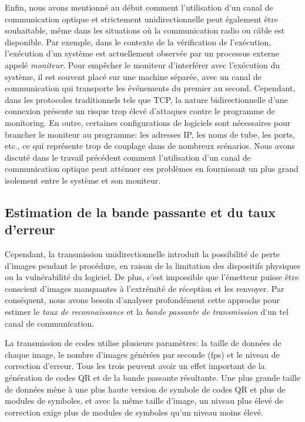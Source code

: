 Enfin, nous avons mentionné au début comment l'utilisation d'un canal de communication optique et strictement unidirectionnelle peut également être souhaitable, même dans les situations où la communication radio ou câble est disponible. Par exemple, dans le contexte de la vérification de l'exécution, l'exécution d'un système est actuellement observée par un processus externe appelé \emph{moniteur}. Pour empêcher le moniteur d'interférer avec l'exécution du système, il est souvent placé sur une machine séparée, avec un canal de communication qui transporte les événements du premier au second. Cependant, dans les protocoles traditionnels tels que TCP, la nature bidirectionnelle d'une connexion présente un risque trop élevé d'attaques contre le programme de monitoring. En outre, certaines configurations de logiciels sont nécessaires pour brancher le moniteur au programme: les adresses IP, les noms de tube, les ports, etc., ce qui représente trop de couplage dans de nombreux scénarios. Nous avons discuté dans le travail précédent \citep{DBLP_conf/rv/LavoieLVGH14} comment l'utilisation d'un canal de communication optique peut atténuer ces problèmes en fournissant un plus grand isolement entre le système et son moniteur.

\subsection{Estimation de la bande passante et du taux d'erreur}

Cependant, la transmission unidirectionnelle introduit la possibilité de perte d'images pendant le procédure, en raison de la limitation des dispositifs physiques ou la vulnérabilité du logiciel. De plus, c'est impossible que l'émetteur puisse être conscient d'images manquantes à l'extrémité de réception et les renvoyer. Par conséquent, nous avons besoin d'analyser profondément cette approche pour estimer le \emph{taux de reconnaissance} et la \emph{bande passante de transmission} d'un tel canal de communication.

La transmission de codes utilise plusieurs paramètres: la taille de données de chaque image, le nombre d'images générées par seconde (fps) et le niveau de correction d'erreur. Tous les trois peuvent avoir un effet important de la génération de codes QR et de la bande passante résultante. Une plus grande taille de données mène à une plus haute version de symbole de codes QR et plus de modules de symboles, et avec la même taille d'image, un niveau plus élevé de correction exige plus de modules de symboles qu'un niveau moins élevé.

